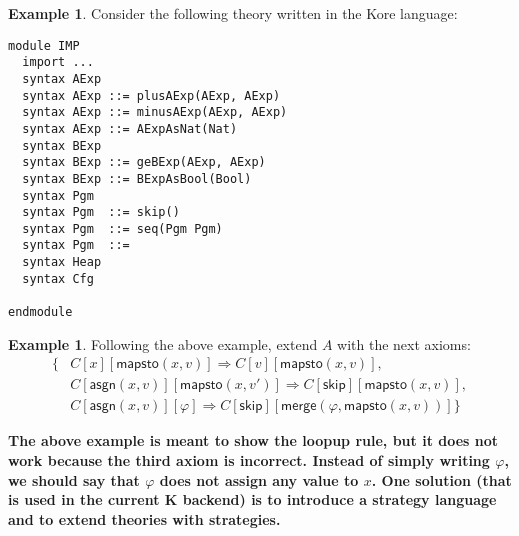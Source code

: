 \documentclass[UTF8]{article}
\newcommand{\comment}[1]
    {\par {\bfseries \color{blue} #1 \par}} %
\newcounter{thmcounter}
\theoremstyle{plain}
\theoremstyle{definition}
\newtheorem{example}[thmcounter]{Example}
\theoremstyle{remark}
\newcommand{\impskip}{\mathsf{skip}}
\newcommand{\impasgn}{\mathsf{asgn}}
\newcommand{\impmapsto}{\mathsf{mapsto}}
\newcommand{\impmerge}{\mathsf{merge}}
\begin{document}
\begin{example}
Consider the following theory written in the Kore language:
\begin{Verbatim}
module IMP
  import ...
  syntax AExp
  syntax AExp ::= plusAExp(AExp, AExp)
  syntax AExp ::= minusAExp(AExp, AExp)
  syntax AExp ::= AExpAsNat(Nat)
  syntax BExp
  syntax BExp ::= geBExp(AExp, AExp)
  syntax BExp ::= BExpAsBool(Bool)
  syntax Pgm
  syntax Pgm  ::= skip()
  syntax Pgm  ::= seq(Pgm Pgm)
  syntax Pgm  ::= 
  syntax Heap
  syntax Cfg
  
endmodule
\end{Verbatim}

\end{example}


\begin{example}
Following the above example, extend $A$ with the next axioms:
\begin{align*}
  \{&C[x][\impmapsto(x, v)] \Rightarrow C[v][\impmapsto(x, v)], \\
    &C[\impasgn(x, v)][\impmapsto(x, v')] \Rightarrow C[\impskip][\impmapsto(x,v)], \\
    &C[\impasgn(x, v)][\varphi] \Rightarrow C[\impskip][\impmerge(\varphi, \impmapsto(x, v))]\}
\end{align*}
\end{example}
\comment{The above example is meant to show the loopup rule, but it does not work because the third axiom is incorrect. Instead of simply writing $\varphi$, we should say that $\varphi$ does not assign any value to $x$. One solution (that is used in the current K backend) is to introduce a strategy language and to extend theories with strategies. }
\end{document}
